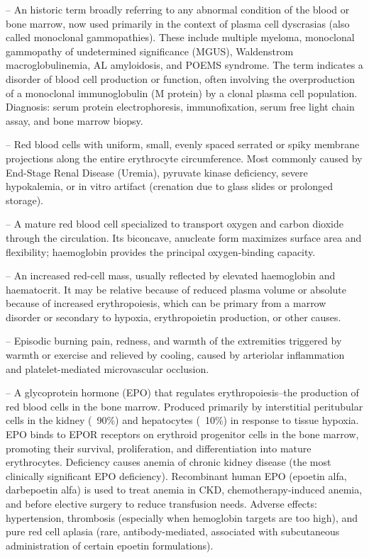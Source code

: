 -- An historic term broadly referring to any abnormal condition of the blood or bone marrow, now used primarily in the context of plasma cell dyscrasias (also called monoclonal gammopathies). These include multiple myeloma, monoclonal gammopathy of undetermined significance (MGUS), Waldenstrom macroglobulinemia, AL amyloidosis, and POEMS syndrome. The term indicates a disorder of blood cell production or function, often involving the overproduction of a monoclonal immunoglobulin (M protein) by a clonal plasma cell population. Diagnosis: serum protein electrophoresis, immunofixation, serum free light chain assay, and bone marrow biopsy.

-- Red blood cells with uniform, small, evenly spaced serrated or spiky membrane projections along the entire erythrocyte circumference. Most commonly caused by End-Stage Renal Disease (Uremia), pyruvate kinase deficiency, severe hypokalemia, or in vitro artifact (crenation due to glass slides or prolonged storage).

-- A mature red blood cell specialized to transport oxygen and carbon dioxide through the circulation. Its biconcave, anucleate form maximizes surface area and flexibility; haemoglobin provides the principal oxygen-binding capacity.

-- An increased red-cell mass, usually reflected by elevated haemoglobin and haematocrit. It may be relative because of reduced plasma volume or absolute because of increased erythropoiesis, which can be primary from a marrow disorder or secondary to hypoxia, erythropoietin production, or other causes.

-- Episodic burning pain, redness, and warmth of the extremities triggered by warmth or exercise and relieved by cooling, caused by arteriolar inflammation and platelet-mediated microvascular occlusion.

-- A glycoprotein hormone (EPO) that regulates erythropoiesis--the production of red blood cells in the bone marrow. Produced primarily by interstitial peritubular cells in the kidney (~90\%) and hepatocytes (~10\%) in response to tissue hypoxia. EPO binds to EPOR receptors on erythroid progenitor cells in the bone marrow, promoting their survival, proliferation, and differentiation into mature erythrocytes. Deficiency causes anemia of chronic kidney disease (the most clinically significant EPO deficiency). Recombinant human EPO (epoetin alfa, darbepoetin alfa) is used to treat anemia in CKD, chemotherapy-induced anemia, and before elective surgery to reduce transfusion needs. Adverse effects: hypertension, thrombosis (especially when hemoglobin targets are too high), and pure red cell aplasia (rare, antibody-mediated, associated with subcutaneous administration of certain epoetin formulations).

